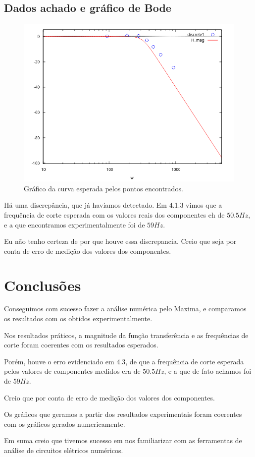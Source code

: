 \documentclass[12pt,twoside, a4paper, twocolumn]{article}
\begin{document}
\subsection{Dados achado e gráfico de Bode}


\begin{figure}[h]
    \centering
    \includegraphics[width=1\columnwidth]{images/magnitudepontosreais.png}
    \caption{Gráfico da curva esperada pelos pontos encontrados.}
\end{figure}


Há uma discrepância, que já havíamos detectado. Em 4.1.3 vimos que a frequência de corte esperada com os valores reais dos componentes eh de $50.5Hz$, e a que encontramos experimentalmente foi de $59Hz$.


Eu não tenho certeza de por que houve essa discrepancia. Creio que seja por conta de erro de medição dos valores dos componentes.


\newpage




\section{Conclusões}


Conseguimos com sucesso fazer a análise numérica pelo Maxima, e comparamos os resultados com os obtidos experimentalmente.


Nos resultados práticos, a magnitude da função transferência e as frequências de corte foram coerentes com os resultados esperados.


Porém, houve o erro evidenciado em 4.3, de que a frequência de corte esperada pelos valores de componentes medidos era de $50.5Hz$, e a que de fato achamos foi de $59Hz$.


Creio que por conta de erro de medição dos valores dos componentes.


Os gráficos que geramos a partir dos resultados experimentais foram coerentes com os gráficos gerados numericamente.


Em suma creio que tivemos sucesso em nos familiarizar com as ferramentas de análise de circuitos elétricos numéricos.
\end{document}
